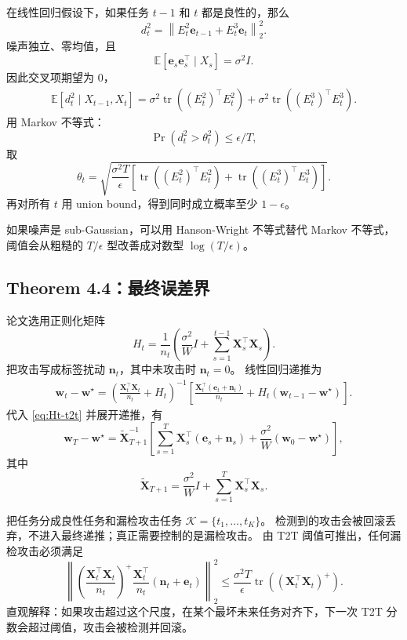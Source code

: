 \documentclass[UTF8,fontset=none,11pt]{ctexart}
\theoremstyle{cnstyle}
\newcommand{\E}{\mathbb{E}}
\newcommand{\tr}{\operatorname{tr}}
\newcommand{\norm}[1]{\left\lVert #1\right\rVert}
\begin{document}
在线性回归假设下，如果任务 \(t-1\) 和 \(t\) 都是良性的，那么
\[
  d_t^2
  =
  \norm{E_t^2\mathbf e_{t-1}+E_t^3\mathbf e_t}_2^2 .
\]
噪声独立、零均值，且
\[
  \E[\mathbf e_s\mathbf e_s^\top\mid X_s]=\sigma^2I .
\]
因此交叉项期望为 0，
\begin{align}
  \E[d_t^2\mid X_{t-1},X_t]
  =
  \sigma^2\tr((E_t^2)^\top E_t^2)
  +
  \sigma^2\tr((E_t^3)^\top E_t^3).
  \label{eq:dt-expectation}
\end{align}
用 Markov 不等式：
\[
  \Pr(d_t^2>\theta_t^2)\le\epsilon/T,
\]
取
\begin{equation}
  \theta_t
  =
  \sqrt{
  \frac{\sigma^2T}{\epsilon}
  \left[
  \tr((E_t^2)^\top E_t^2)
  +
  \tr((E_t^3)^\top E_t^3)
  \right]
  }.
  \label{eq:theta}
\end{equation}
再对所有 \(t\) 用 union bound，得到同时成立概率至少 \(1-\epsilon\)。

如果噪声是 sub-Gaussian，可以用 Hanson-Wright 不等式替代 Markov 不等式，
阈值会从粗糙的 \(T/\epsilon\) 型改善成对数型 \(\log(T/\epsilon)\)。

\subsection{Theorem 4.4：最终误差界}

论文选用正则化矩阵
\begin{equation}
  H_t=\frac{1}{n_t}
  \left(
  \frac{\sigma^2}{W}I+\sum_{s=1}^{t-1}\mathbf X_s^\top\mathbf X_s
  \right).
  \label{eq:Ht-t2t}
\end{equation}
把攻击写成标签扰动 \(\mathbf n_t\)，其中未攻击时 \(\mathbf n_t=0\)。
线性回归递推为
\begin{align}
  \mathbf w_t-\mathbf w^\star
  =
  \left(
  \frac{\mathbf X_t^\top\mathbf X_t}{n_t}+H_t
  \right)^{-1}
  \left[
  \frac{\mathbf X_t^\top(\mathbf e_t+\mathbf n_t)}{n_t}
  +H_t(\mathbf w_{t-1}-\mathbf w^\star)
  \right].
  \label{eq:t2t-linear-recursion}
\end{align}
代入 \eqref{eq:Ht-t2t} 并展开递推，有
\begin{equation}
  \mathbf w_T-\mathbf w^\star
  =
  \tilde{\mathbf X}_{T+1}^{-1}
  \left[
  \sum_{s=1}^T\mathbf X_s^\top(\mathbf e_s+\mathbf n_s)
  +\frac{\sigma^2}{W}(\mathbf w_0-\mathbf w^\star)
  \right],
  \label{eq:t2t-unroll}
\end{equation}
其中
\[
  \tilde{\mathbf X}_{T+1}
  =
  \frac{\sigma^2}{W}I+\sum_{s=1}^T\mathbf X_s^\top\mathbf X_s .
\]

把任务分成良性任务和漏检攻击任务 \(\mathcal K=\{t_1,\dots,t_K\}\)。
检测到的攻击会被回滚丢弃，不进入最终递推；真正需要控制的是漏检攻击。
由 T2T 阈值可推出，任何漏检攻击必须满足
\begin{equation}
  \left\|
  \left(
  \frac{\mathbf X_t^\top\mathbf X_t}{n_t}
  \right)^+
  \frac{\mathbf X_t^\top}{n_t}
  (\mathbf n_t+\mathbf e_t)
  \right\|_2^2
  \le
  \frac{\sigma^2T}{\epsilon}
  \tr\!\left((\mathbf X_t^\top\mathbf X_t)^+\right).
  \label{eq:undetected-bound}
\end{equation}
直观解释：如果攻击超过这个尺度，在某个最坏未来任务对齐下，下一次 T2T 分数会超过阈值，攻击会被检测并回滚。
\end{document}

